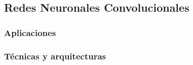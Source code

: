 \subsection{Redes Neuronales Convolucionales}

\subsubsection{Aplicaciones}

\subsubsection{Técnicas y arquitecturas}
